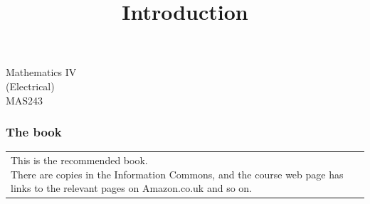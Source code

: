 \documentclass[9pt]{beamer}
\title{Introduction}
\author{}
\begin{document}
\begin{frame}[t]
\frametitle{}
{\Huge \vspace{6ex}
   \begin{center}
    Mathematics IV\\(Electrical)\\MAS243
   \end{center}
  }
\end{frame}

\begin{frame}[t]
\frametitle{The book}
 \begin{tabular}{ll}
  \parbox[t]{5cm}{
   This is the recommended book.\\[4ex]
   There are copies in the Information Commons,
   and the course web page has links to the 
   relevant pages on Amazon.co.uk and so on.
  } &
 \end{tabular}
\end{frame}
\end{document}
